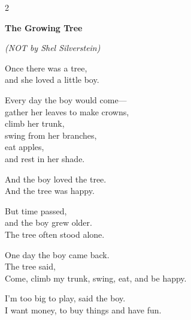 \newpage
\thispagestyle{fancy}
\vfill
\begin{center}

\selectfont
\begin{minipage}{0.85\textwidth}
\begin{multicols}{2}
{\raggedright\Huge\textbf{The Growing Tree}\par}\vspace{0.3em}
{\large\textit{(NOT by Shel Silverstein)}}

\vspace{1.5em}

{\large Once there was a tree,\\
and she loved a little boy.}

\vspace{0.5em}

{\large Every day the boy would come—\\
gather her leaves to make crowns,\\
climb her trunk,\\
swing from her branches,\\
eat apples,\\
and rest in her shade.}

\vspace{0.5em}

{\large And the boy loved the tree.\\
And the tree was happy.}

\vspace{0.5em}

{\large But time passed,\\
and the boy grew older.\\
The tree often stood alone.}

\vspace{0.5em}

{\large One day the boy came back.\\
The tree said,\\
\QENOpen{}Come, climb my trunk, swing, eat, and be happy.\QENClose{}}

\vspace{0.5em}

{\large \QENOpen{}I'm too big to play,\QENClose{} said the boy.\\
\QENOpen{}I want money, to buy things and have fun.\QENClose{}}


\end{multicols}
\end{minipage}
\end{center}
